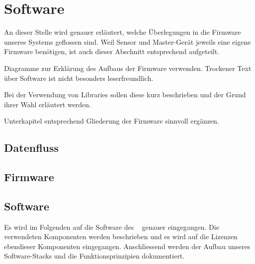 \chapter{Software}
\label{chap:software}


An  dieser  Stelle wird  genauer  erl\"autert,  welche \"Uberlegungen  in  die
Firmware  unseres  Systems  geflossen  sind. Weil  Sensor  und  Master-Ger\"at
jeweils  eine   eigene  Firmware   ben\"otigen,  ist  auch   dieser  Abschnitt
entsprechend aufgeteilt.

\anweisung   Diagramme    zur   Erkl\"arung    des   Aufbaus    der   Firmware
verwenden. Trockener    Text    \"uber    Software   ist    nicht    besonders
leserfreundlich.

\anweisung Bei der Verwendung von  Libraries sollen diese kurz beschrieben und
der Grund ihrer Wahl erl\"autert werden.

\anweisung   Unterkapitel  entsprechend   Gliederung  der   Firmware  sinnvoll
erg\"anzen.


\section{Datenfluss}
\label{sec:fw:dataFlow}


\section{Firmware \Sensor}
\label{sec:firmware:sensor}



\section{Software \Master}
\label{sec:software:master}

Es wird  im Folgenden auf  die Software des \Master~  genauer eingegangen. Die
verwendeten  Komponenten  werden beschrieben  und  es  wird auf  die  Lizenzen
ebendieser  Komponenten eingegangen. Anschliessend  werden der  Aufbau unseres
Software-Stacks und die Funktionsprinzipien dokumentiert.


